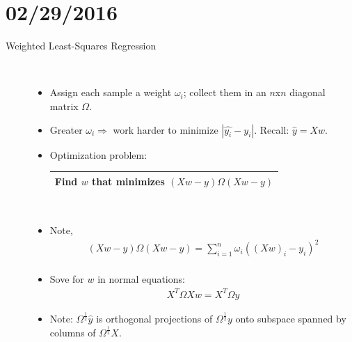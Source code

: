 \documentclass[10pt]{article}
\begin{document}
\section*{02/29/2016}
\begin{description}
	\item[Weighted Least-Squares Regression]
	\
	\begin{itemize}
		\item Assign each sample a weight $\omega_{i}$; collect them in an $n$x$n$ diagonal matrix $\Omega$.
		\item Greater $\omega_{i} \Rightarrow$ work harder to minimize $|\hat{y_{i}} - y_{i}|$. Recall: $\hat{y} = Xw$.
		\item Optimization problem:
			\begin{center}
				\begin{tabular}{|c|}
					\hline
					Find $w$ that minimizes $(Xw - y) \Omega (Xw-y)$\\
					\hline
				\end{tabular}\\
			\end{center}
		\item Note,
			\begin{align*}
				(Xw - y) \Omega (Xw-y) = \sum_{i=1}^{n} \omega_{i}((Xw)_{i} - y_{i})^{2}\\
			\end{align*}
		\item Sove for $w$ in normal equations:	
			\begin{align*}
				X^{T}\Omega Xw = X^{T}\Omega y
			\end{align*}
		\item Note: $\Omega^{\frac{1}{2}}\hat{y}$ is orthogonal projections of $\Omega^{\frac{1}{2}}y$ onto subspace spanned by columns of $\Omega^{\frac{1}{2}}X$.
	\end{itemize}
	

\end{description}
\end{document}
